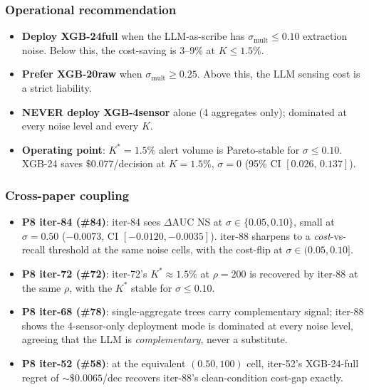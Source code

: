 \subsubsection{Operational recommendation}
\begin{itemize}
\item \textbf{Deploy XGB-24full} when the LLM-as-scribe has
      $\sigma_{\text{mult}} \le 0.10$ extraction noise. Below this, the
      cost-saving is 3--9\% at $K \le 1.5\%$.
\item \textbf{Prefer XGB-20raw} when $\sigma_{\text{mult}} \ge 0.25$.
      Above this, the LLM sensing cost is a strict liability.
\item \textbf{NEVER deploy XGB-4sensor} alone (4 aggregates only);
      dominated at every noise level and every $K$.
\item \textbf{Operating point}: $K^* = 1.5\%$ alert volume is
      Pareto-stable for $\sigma \le 0.10$. XGB-24 saves
      $\$0.077$/decision at $K = 1.5\%$, $\sigma = 0$ (95\% CI
      $[0.026,\, 0.137]$).
\end{itemize}

\subsubsection{Cross-paper coupling}
\begin{itemize}
\item \textbf{P8 iter-84 (\#84)}: iter-84 sees $\Delta$AUC NS at
      $\sigma \in \{0.05, 0.10\}$, small at $\sigma = 0.50$ ($-0.0073$,
      CI $[-0.0120, -0.0035]$). iter-88 sharpens to a
      \emph{cost}-vs-recall threshold at the same noise cells, with the
      cost-flip at $\sigma \in (0.05, 0.10]$.
\item \textbf{P8 iter-72 (\#72)}: iter-72's $K^* \approx 1.5\%$ at
      $\rho = 200$ is recovered by iter-88 at the same $\rho$, with the
      $K^*$ stable for $\sigma \le 0.10$.
\item \textbf{P8 iter-68 (\#78)}: single-aggregate trees carry
      complementary signal; iter-88 shows the 4-sensor-only deployment
      mode is dominated at every noise level, agreeing that the LLM is
      \emph{complementary}, never a substitute.
\item \textbf{P8 iter-52 (\#58)}: at the equivalent $(0.50, 100)$
      cell, iter-52's XGB-24-full regret of $\sim \$0.0065$/dec
      recovers iter-88's clean-condition cost-gap exactly.
\end{itemize}
